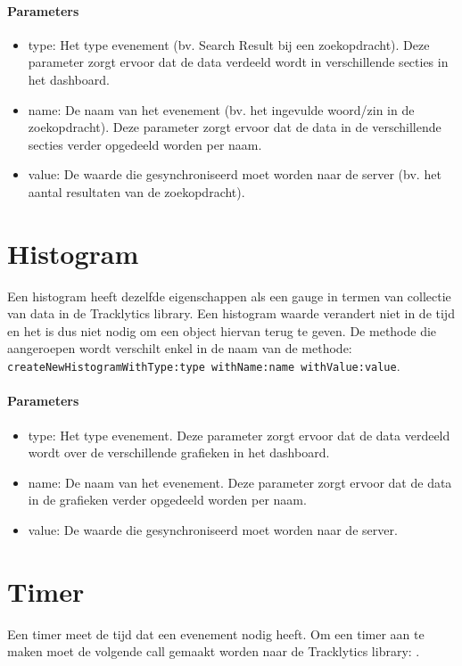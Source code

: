 \paragraph{Parameters}
\begin{itemize}
\item type: Het type evenement (bv. Search Result bij een zoekopdracht). Deze parameter zorgt ervoor dat de data verdeeld wordt in verschillende secties in het dashboard.
\item name: De naam van het evenement (bv. het ingevulde woord/zin in de zoekopdracht). Deze parameter zorgt ervoor dat de data in de verschillende secties verder opgedeeld worden per naam.
\item value: De waarde die gesynchroniseerd moet worden naar de server (bv. het aantal resultaten van de zoekopdracht).
\end{itemize}

\section{Histogram}
Een histogram heeft dezelfde eigenschappen als een gauge in termen van collectie van data in de Tracklytics library. Een histogram waarde verandert niet in de tijd en het is dus niet nodig om een object hiervan terug te geven. De methode die aangeroepen wordt verschilt enkel in de naam van de methode: \texttt{\justify  createNewHistogramWithType:type withName:name withValue:value}. 

\paragraph{Parameters}
\begin{itemize}
\item type: Het type evenement. Deze parameter zorgt ervoor dat de data verdeeld wordt over de verschillende grafieken in het dashboard.
\item name: De naam van het evenement. Deze parameter zorgt ervoor dat de data in de grafieken verder opgedeeld worden per naam.
\item value: De waarde die gesynchroniseerd moet worden naar de server.
\end{itemize}

\section{Timer}
Een timer meet de tijd dat een evenement nodig heeft. Om een timer aan te maken moet de volgende call gemaakt worden naar de Tracklytics library: \texttt{}.

